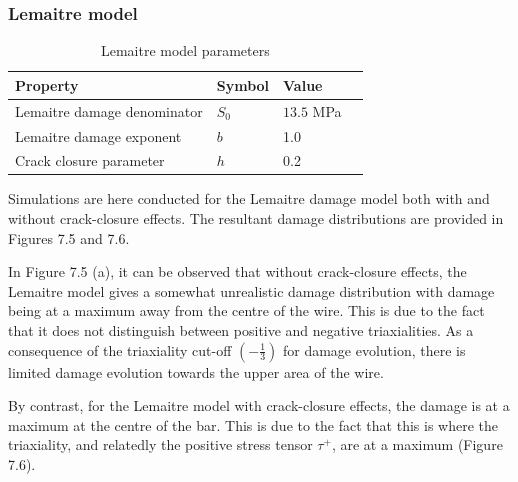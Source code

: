 \documentclass[sn-mathphys,Numbered,draft]{sn-jnl}%
\begin{document}
\subsubsection{Lemaitre model}

\begin{table}[htb]
	\centering
		\begin{tabular}{llll} \hline
			Property & Symbol & Value  \\ \hline 
			Lemaitre damage denominator & $S_0$ & $13.5$ MPa  \\
			Lemaitre damage exponent & $b$ & 1.0  \\
            Crack closure parameter & $h$ & 0.2 \\
			\hline
		\end{tabular}
	\caption{Lemaitre model parameters}
	\label{tab:material_properties}
\end{table}

Simulations are here conducted for the Lemaitre damage model both with and without crack-closure effects. The resultant damage distributions are provided in Figures 7.5 and 7.6. 

In Figure 7.5 (a), it can be observed that without crack-closure effects, the Lemaitre model gives a somewhat unrealistic damage distribution with damage being at a maximum away from the centre of the wire. This is due to the fact that it does not distinguish between positive and negative triaxialities.  As a consequence of the triaxiality cut-off  $\left(-\frac{1}{3}\right)$ for damage evolution, there is limited damage evolution towards the upper area of the wire.

By contrast, for the Lemaitre model with crack-closure effects, the damage is at a maximum at the centre of the bar. This is due to the fact that this is where the triaxiality, and relatedly the positive stress tensor $\tau^+$, are at a maximum (Figure 7.6). 
\end{document}
